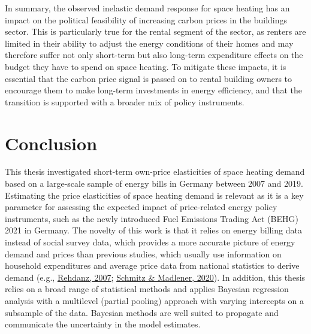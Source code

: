 \documentclass[12pt,twoside]{reedthesis}
\begin{document}
In summary, the observed inelastic demand response for space heating has an impact on the political feasibility of increasing carbon prices in the buildings sector. This is particularly true for the rental segment of the sector, as renters are limited in their ability to adjust the energy conditions of their homes and may therefore suffer not only short-term but also long-term expenditure effects on the budget they have to spend on space heating. To mitigate these impacts, it is essential that the carbon price signal is passed on to rental building owners to encourage them to make long-term investments in energy efficiency, and that the transition is supported with a broader mix of policy instruments.

\hypertarget{conclusion}{%
\chapter{Conclusion}\label{conclusion}}

This thesis investigated short-term own-price elasticities of space heating demand based on a large-scale sample of energy bills in Germany between 2007 and 2019. Estimating the price elasticities of space heating demand is relevant as it is a key parameter for assessing the expected impact of price-related energy policy instruments, such as the newly introduced Fuel Emissions Trading Act (BEHG) 2021 in Germany. The novelty of this work is that it relies on energy billing data instead of social survey data, which provides a more accurate picture of energy demand and prices than previous studies, which usually use information on household expenditures and average price data from national statistics to derive demand (e.g., \protect\hyperlink{ref-rehdanz07}{Rehdanz, 2007}; \protect\hyperlink{ref-schmitz_madlener20}{Schmitz \& Madlener, 2020}). In addition, this thesis relies on a broad range of statistical methods and applies Bayesian regression analysis with a multilevel (partial pooling) approach with varying intercepts on a subsample of the data. Bayesian methods are well suited to propagate and communicate the uncertainty in the model estimates.
\end{document}
